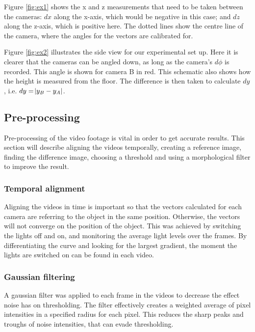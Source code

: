 \documentclass{article}
\begin{document}
Figure \ref{fig:ex1} shows the x and z measurements that need to be taken between the cameras: $dx$ along the x-axis, which would be negative in this case; and $dz$ along the z-axis, which is positive here. The dotted lines show the centre line of the camera, where the angles for the vectors are calibrated for. 

Figure \ref{fig:ex2} illustrates the side view for our experimental set up. Here it is clearer that the cameras can be angled down, as long as the camera's $d\phi$ is recorded. This angle is shown for camera B in red. This schematic also shows how the height is measured from the floor. The difference is then taken to calculate $dy$, i.e. $dy = \abs{y_B-y_A}$.

 \vspace{5cm}
\subsection{Pre-processing}

Pre-processing of the video footage is vital in order to get accurate results. This section will describe aligning the videos temporally, creating a reference image, finding the difference image, choosing a threshold and using a morphological filter to improve the result. 

\subsubsection{Temporal alignment}

Aligning the videos in time is important so that the vectors calculated for each camera are referring to the object in the same position. Otherwise, the vectors will not converge on the position of the object. This was achieved by switching the lights off and on, and monitoring the average light levels over the frames. By differentiating the curve and looking for the largest gradient, the moment the lights are switched on can be found in each video.
\subsubsection{Gaussian filtering}

A gaussian filter was applied to each frame in the videos to decrease the effect noise has on thresholding. The filter effectively creates a weighted average of pixel intensities in a specified radius for each pixel. This reduces the sharp peaks and troughs of noise intensities, that can evade thresholding. 
 
\end{document}
